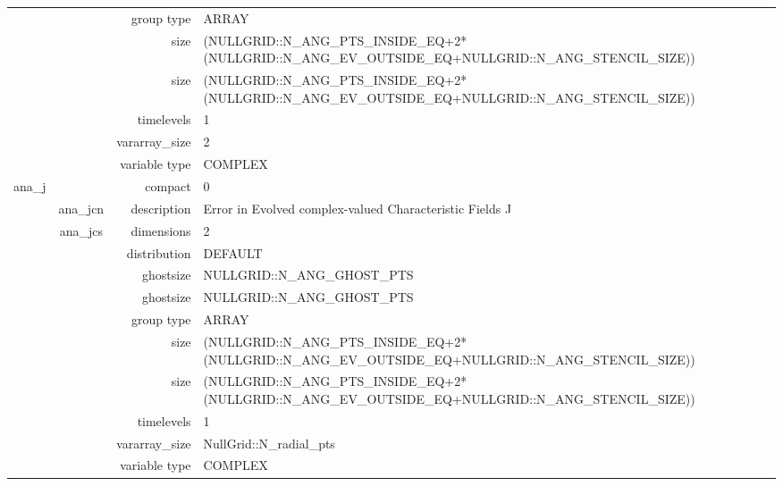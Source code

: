 \begin{tabular*}{150mm}{|c|c@{\extracolsep{\fill}}|rl|}
 &  & group type & ARRAY \\ 
 &  & size & (NULLGRID::N\_ANG\_PTS\_INSIDE\_EQ+2*(NULLGRID::N\_ANG\_EV\_OUTSIDE\_EQ+NULLGRID::N\_ANG\_STENCIL\_SIZE)) \\ 
& ~ & size & (NULLGRID::N\_ANG\_PTS\_INSIDE\_EQ+2*(NULLGRID::N\_ANG\_EV\_OUTSIDE\_EQ+NULLGRID::N\_ANG\_STENCIL\_SIZE)) \\ 
 &  & timelevels & 1 \\ 
 &  & vararray\_size & 2 \\ 
 &  & variable type & COMPLEX \\ 
\hline 
ana\_j &  & compact & 0 \\ 
 & ana\_jcn & description & Error in Evolved complex-valued Characteristic Fields J \\ 
 & ana\_jcs & dimensions & 2 \\ 
 &  & distribution & DEFAULT \\ 
 &  & ghostsize & NULLGRID::N\_ANG\_GHOST\_PTS \\ 
& ~ & ghostsize & NULLGRID::N\_ANG\_GHOST\_PTS \\ 
 &  & group type & ARRAY \\ 
 &  & size & (NULLGRID::N\_ANG\_PTS\_INSIDE\_EQ+2*(NULLGRID::N\_ANG\_EV\_OUTSIDE\_EQ+NULLGRID::N\_ANG\_STENCIL\_SIZE)) \\ 
& ~ & size & (NULLGRID::N\_ANG\_PTS\_INSIDE\_EQ+2*(NULLGRID::N\_ANG\_EV\_OUTSIDE\_EQ+NULLGRID::N\_ANG\_STENCIL\_SIZE)) \\ 
 &  & timelevels & 1 \\ 
 &  & vararray\_size & NullGrid::N\_radial\_pts \\ 
 &  & variable type & COMPLEX \\ 
\hline 
\end{tabular*} 



\vspace{5mm}
\vspace{5mm}

